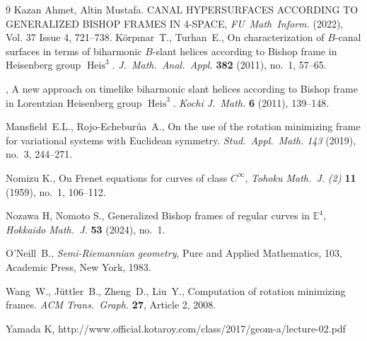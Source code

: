 \documentclass[a4paper]{amsart}
\theoremstyle{definition}
\theoremstyle{remark}
\newcommand{\EE}{\mathbb{E}}
\numberwithin{equation}{section}
\begin{document}
\begin{thebibliography}{9}
    Kazan Ahmet, Altin Mustafa. CANAL HYPERSURFACES ACCORDING TO GENERALIZED BISHOP FRAMES IN 4-SPACE, \textit{FU\ Math\ Inform.} (2022), Vol. 37 Issue 4, 721--738.
     K\"orpınar\ T., Turhan\ E., On characterization of $B$-canal surfaces in terms of biharmonic $B$-slant helices according to Bishop frame in Heisenberg group $\operatorname{Heis}^{3}$. \textit{J.\ Math.\ Anal.\ Appl.} \textbf{382} (2011), no.\ 1, 57--65.
    
    \bysame, A new approach on timelike biharmonic slant helices according to Bishop frame in Lorentzian Heisenberg group $\operatorname{Heis}^{3}$. \textit{Kochi J.\ Math.} \textbf{6} (2011), 139--148.

    Mansfield\ E.L., Rojo-Echebur\'ua\ A., On the use of the rotation minimizing frame for variational systems with Euclidean symmetry. \textit{Stud.\ Appl.\ Math.} \textit{143} (2019), no.\ 3, 244--271.
    
    Nomizu K., On Frenet equations for curves of class $C^{\infty}$, \textit{Tohoku Math.\ J. (2)} \textbf{11} (1959), no.\ 1, 106--112.

    Nozawa H, Nomoto S., Generalized Bishop frames of regular curves in $\EE^{4}$, \textit{Hokkaido Math.\ J.} \textbf{53} (2024), no.\ 1.

     O'Neill\ B., {\it Semi-Riemannian geometry}, Pure and Applied Mathematics, 103, Academic Press, New York, 1983.

     Wang\ W., J\"uttler\ B., Zheng\ D., Liu\ Y., Computation of rotation minimizing frames. \textit{ACM Trans.\ Graph.} \textbf{27}, Article 2, 2008.
    
    Yamada K,
    http://www.official.kotaroy.com/class/2017/geom-a/lecture-02.pdf
  
    
  
\end{thebibliography}
    
\end{document}
